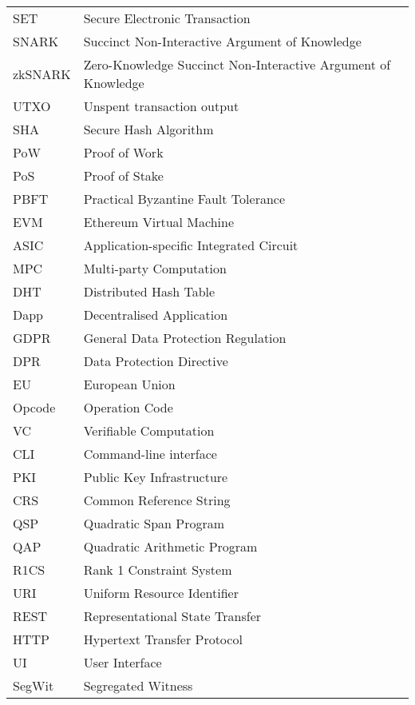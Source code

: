 
\abbreviations
\begin{center}
	\renewcommand{\arraystretch}{1.5}
	\begin{longtable}{ l @{\qquad} l }
	\toprule
	SET    & Secure Electronic Transaction \\
	SNARK & Succinct Non-Interactive Argument of Knowledge \\
	zkSNARK    & Zero-Knowledge Succinct Non-Interactive Argument of Knowledge \\
	UTXO    & Unspent transaction output \\
	SHA    & Secure Hash Algorithm \\
	PoW    & Proof of Work \\
	PoS    & Proof of Stake \\
	PBFT    & Practical Byzantine Fault Tolerance \\
	EVM    & Ethereum Virtual Machine \\
	ASIC    & Application-specific Integrated Circuit \\
	MPC    & Multi-party Computation \\
	DHT    & Distributed Hash Table \\
	Dapp    & Decentralised Application \\
	GDPR    & General Data Protection Regulation \\
	DPR    & Data Protection Directive \\
	EU    & European Union \\
	Opcode    & Operation Code \\
	VC    & Verifiable Computation \\
	CLI    & Command-line interface \\
	PKI    & Public Key Infrastructure \\
	CRS    & Common Reference String \\
	QSP    & Quadratic Span Program \\
	QAP    & Quadratic Arithmetic Program \\
	R1CS    & Rank 1 Constraint System \\
	URI    & Uniform Resource Identifier \\
	REST    & Representational State Transfer \\
	HTTP    & Hypertext Transfer Protocol \\
	UI    & User Interface \\
	SegWit    & Segregated Witness \\

\end{longtable}
\end{center}
